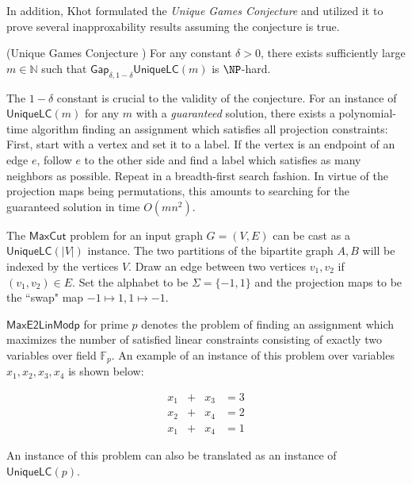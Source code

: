 In addition, Khot formulated the \emph{Unique Games Conjecture} and utilized it to prove several inapproxability results assuming the conjecture is true.

\begin{conjecture} (Unique Games Conjecture \cite{khot2002power})
  For any constant $\delta > 0$, there exists sufficiently large $m \in \mathbb{N}$ such that $\mathsf{Gap}_{\delta,1-\delta}\mathsf{UniqueLC}(m)$ is $\NP$-hard.
\end{conjecture}

\begin{remark}
  The $1-\delta$ constant is crucial to the validity of the conjecture. For an instance of $\mathsf{UniqueLC}(m)$ for any $m$ with a \emph{guaranteed} solution, there exists a polynomial-time algorithm finding an assignment which satisfies all projection constraints: First, start with a vertex and set it to a label. If the vertex is an endpoint of an edge $e$, follow $e$ to the other side and find a label which satisfies as many neighbors as possible. Repeat in a breadth-first search fashion. In virtue of the projection maps being permutations, this amounts to searching for the guaranteed solution in time $O(mn^2)$.
\end{remark}

\begin{example}
  The $\mathsf{MaxCut}$ problem for an input graph $G = (V,E)$ can be cast as a $\mathsf{UniqueLC}(|V|)$ instance. The two partitions of the bipartite graph $A,B$ will be indexed by the vertices $V$. Draw an edge between two vertices $v_1,v_2$ if $(v_1,v_2) \in E$. Set the alphabet to be $\Sigma =\{-1,1\}$ and the projection maps to be the ``swap" map $-1 \mapsto 1, 1 \mapsto -1$.
\end{example}

\begin{example}
  $\mathsf{MaxE2LinModp}$ for prime $p$ denotes the problem of finding an assignment which maximizes the number of satisfied linear constraints consisting of exactly two variables over field $\mathbb{F}_p$. An example of an instance of this problem over variables $x_1,x_2,x_3,x_4$ is shown below:

  \begin{equation*}
    \begin{alignedat}{3}
      x_1 & +{} & x_3 & = 3 \\
      x_2 & +{}  & x_4 & = 2 \\
      x_1 & +{} & x_4 & = 1
    \end{alignedat}
  \end{equation*}

  An instance of this problem can also be translated as an instance of $\mathsf{UniqueLC}(p)$.
\end{example}

